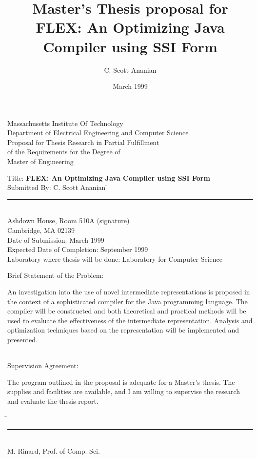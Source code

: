 \documentclass[12pt,oneside]{article}
\title{{\large Master's Thesis proposal for}\\
FLEX: An Optimizing Java Compiler using SSI Form}
\author{C. Scott Ananian}
\date{March 1999\\\vspace{5pt}}
\begin{document}

\begin{titlepage}
\setlength{\baselineskip}{0.9\baselineskip}
\newcommand{\nl}{\\[0.4\baselineskip]}
\newcommand{\tight}{\\[-0.1\baselineskip]}
\newcommand{\tighter}{\\[-0.2\baselineskip]}
\begin{centering}\large
Massachusetts Institute Of Technology\tight
Department of Electrical Engineering and Computer Science\nl
%
Proposal for Thesis Research in Partial Fulfillment\tight
of the Requirements for the Degree of\tight
Master of Engineering\nl
\end{centering}
\vspace{0.1cm}
\begin{tabbing}
Title: \textbf{FLEX: An Optimizing Java Compiler using SSI Form}\nl
Submitted By: \= C. Scott Ananian \hspace{3cm}\=\rule{6cm}{0.5pt}\tighter
              \> Ashdown House, Room 510A     \>(signature)\tighter
              \> Cambridge, MA 02139\nl
Date of Submission: March 1999\nl
Expected Date of Completion: September 1999\nl
Laboratory where thesis will be done: Laboratory for Computer
Science%
\end{tabbing}
Brief Statement of the Problem:

An investigation into the use of novel intermediate representations is
proposed in the context of a sophisticated compiler for the Java
programming language.  The compiler will be constructed and both
theoretical and practical methods will be used to evaluate the
effectiveness of the intermediate representation.  Analysis and
optimization techniques based on the representation will be
implemented and presented.

~\\Supervision Agreement:

The program outlined in the proposal is adequate for a Master's
thesis.  The supplies and facilities are available, and I am willing
to supervise the research and evaluate the thesis report.

\begin{tabbing}
\hspace{3.5in}\=\kill
\>\rule{2.5in}{0.5pt}\\
\>M. Rinard, Prof. of Comp. Sci.\\
\end{tabbing}

\end{titlepage}
\end{document}
